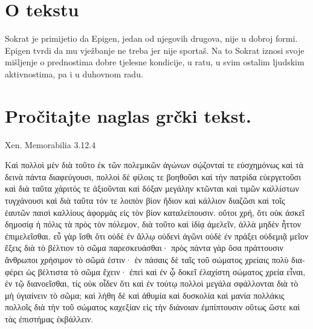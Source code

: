 


\section*{O tekstu}

Sokrat je primijetio da Epigen, jedan od njegovih drugova, nije u dobroj formi. Epigen tvrdi da mu vježbanje ne treba jer nije sportaš. Na to Sokrat iznosi svoje mišljenje o prednostima dobre tjelesne kondicije, u ratu, u svim ostalim ljudskim aktivnostima, pa i u duhovnom radu.


\section*{Pročitajte naglas grčki tekst.}
Xen. Memorabilia 3.12.4

\medskip

{\large
\begin{greek}

\noindent Καὶ πολλοὶ μὲν διὰ τοῦτο ἐκ τῶν πολεμικῶν ἀγώνων σῴζονταί τε εὐσχημόνως καὶ τὰ δεινὰ πάντα διαφεύγουσι, πολλοὶ δὲ φίλοις τε βοηθοῦσι καὶ τὴν πατρίδα εὐεργετοῦσι καὶ διὰ ταῦτα χάριτός τε ἀξιοῦνται καὶ δόξαν μεγάλην κτῶνται καὶ τιμῶν καλλίστων τυγχάνουσι καὶ διὰ ταῦτα τόν τε λοιπὸν βίον ἥδιον καὶ κάλλιον διαζῶσι καὶ τοῖς ἑαυτῶν παισὶ καλλίους ἀφορμὰς εἰς τὸν βίον καταλείπουσιν. οὔτοι χρή, ὅτι οὐκ ἀσκεῖ δημοσίᾳ ἡ πόλις τὰ πρὸς τὸν πόλεμον, διὰ τοῦτο καὶ ἰδίᾳ ἀμελεῖν, ἀλλὰ μηδὲν ἧττον ἐπιμελεῖσθαι. εὖ γὰρ ἴσθι ὅτι οὐδὲ ἐν ἄλλῳ οὐδενὶ ἀγῶνι οὐδὲ ἐν πράξει οὐδεμιᾷ μεῖον ἕξεις διὰ τὸ βέλτιον τὸ σῶμα παρεσκευάσθαι· πρὸς πάντα γὰρ ὅσα πράττουσιν ἄνθρωποι χρήσιμον τὸ σῶμά ἐστιν· ἐν πάσαις δὲ ταῖς τοῦ σώματος χρείαις πολὺ διαφέρει ὡς βέλτιστα τὸ σῶμα ἔχειν· ἐπεὶ καὶ ἐν ᾧ δοκεῖ ἐλαχίστη σώματος χρεία εἶναι, ἐν τῷ διανοεῖσθαι, τίς οὐκ οἶδεν ὅτι καὶ ἐν τούτῳ πολλοὶ μεγάλα σφάλλονται διὰ τὸ μὴ ὑγιαίνειν τὸ σῶμα; καὶ λήθη δὲ καὶ ἀθυμία καὶ δυσκολία καὶ μανία πολλάκις πολλοῖς διὰ τὴν τοῦ σώματος καχεξίαν εἰς τὴν διάνοιαν ἐμπίπτουσιν οὕτως ὥστε καὶ τὰς ἐπιστήμας ἐκβάλλειν.

\end{greek}

}

